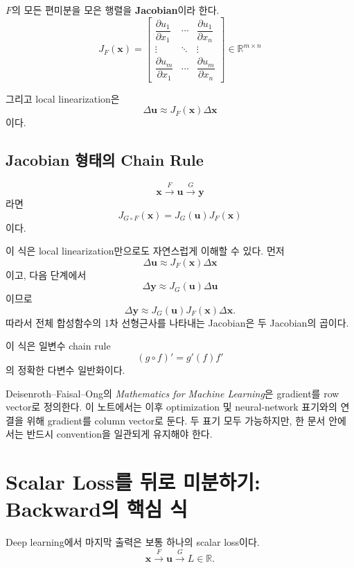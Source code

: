 \documentclass[11pt,a4paper]{article}
\newcommand{\R}{\mathbb{R}}
\newcommand{\vect}[1]{\bm{#1}}
\begin{document}
$F$의 모든 편미분을 모은 행렬을 \textbf{Jacobian}이라 한다.
\[
\boxed{
J_F(\vect{x})
=
\begin{bmatrix}
\dfrac{\partial u_1}{\partial x_1} & \cdots & \dfrac{\partial u_1}{\partial x_n}\\[0.5em]
\vdots & \ddots & \vdots\\[0.3em]
\dfrac{\partial u_m}{\partial x_1} & \cdots & \dfrac{\partial u_m}{\partial x_n}
\end{bmatrix}
\in\R^{m\times n}
}
\]

그리고 local linearization은
\[
\boxed{
\Delta\vect{u}
\approx
J_F(\vect{x})\Delta\vect{x}
}
\]
이다.

\subsection{Jacobian 형태의 Chain Rule}

\[
\vect{x}\xrightarrow{F}\vect{u}\xrightarrow{G}\vect{y}
\]
라면
\[
\boxed{
J_{G\circ F}(\vect{x})
=
J_G(\vect{u})J_F(\vect{x})
}
\]
이다.

이 식은 local linearization만으로도 자연스럽게 이해할 수 있다. 먼저
\[
\Delta\vect{u}\approx J_F(\vect{x})\Delta\vect{x}
\]
이고, 다음 단계에서
\[
\Delta\vect{y}\approx J_G(\vect{u})\Delta\vect{u}
\]
이므로
\[
\Delta\vect{y}
\approx
J_G(\vect{u})J_F(\vect{x})\Delta\vect{x}.
\]
따라서 전체 합성함수의 1차 선형근사를 나타내는 Jacobian은 두 Jacobian의 곱이다.

이 식은 일변수 chain rule
\[
(g\circ f)'=g'(f)f'
\]
의 정확한 다변수 일반화이다.

\begin{remarkbox}[교재 표기와의 차이]
Deisenroth--Faisal--Ong의 \emph{Mathematics for Machine Learning}은 gradient를 row vector로 정의한다.
이 노트에서는 이후 optimization 및 neural-network 표기와의 연결을 위해 gradient를 column vector로 둔다.
두 표기 모두 가능하지만, 한 문서 안에서는 반드시 convention을 일관되게 유지해야 한다.
\end{remarkbox}

\section{Scalar Loss를 뒤로 미분하기: Backward의 핵심 식}

Deep learning에서 마지막 출력은 보통 하나의 scalar loss이다.
\[
\vect{x}
\xrightarrow{F}
\vect{u}
\xrightarrow{G}
L\in\R.
\]
\end{document}
